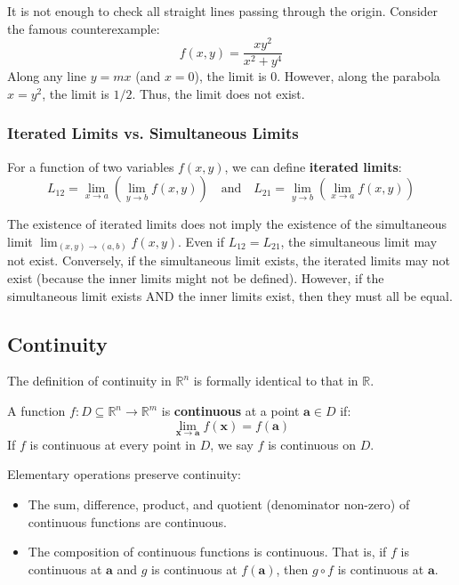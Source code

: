 \documentclass[oneside]{book}
\begin{document}
\begin{remark}
It is not enough to check all straight lines passing through the origin. Consider the famous counterexample:
\[ f(x, y) = \frac{x y^2}{x^2 + y^4} \]
Along any line $y = mx$ (and $x=0$), the limit is $0$. However, along the parabola $x = y^2$, the limit is $1/2$. Thus, the limit does not exist.
\end{remark}

\subsubsection{Iterated Limits vs. Simultaneous Limits}

For a function of two variables $f(x,y)$, we can define \textbf{iterated limits}:
\[ L_{12} = \lim_{x \to a} \left( \lim_{y \to b} f(x, y) \right) \quad \text{and} \quad L_{21} = \lim_{y \to b} \left( \lim_{x \to a} f(x, y) \right) \]

\begin{proposition}
The existence of iterated limits does not imply the existence of the simultaneous limit $\lim_{(x,y) \to (a,b)} f(x,y)$.
Even if $L_{12} = L_{21}$, the simultaneous limit may not exist.
Conversely, if the simultaneous limit exists, the iterated limits may not exist (because the inner limits might not be defined).
However, if the simultaneous limit exists AND the inner limits exist, then they must all be equal.
\end{proposition}

\subsection{Continuity}

The definition of continuity in $\mathbb{R}^n$ is formally identical to that in $\mathbb{R}$.

\begin{definition}[Continuity]
A function $f: D \subseteq \mathbb{R}^n \to \mathbb{R}^m$ is \textbf{continuous} at a point $\mathbf{a} \in D$ if:
\[ \lim_{\mathbf{x} \to \mathbf{a}} f(\mathbf{x}) = f(\mathbf{a}) \]
If $f$ is continuous at every point in $D$, we say $f$ is continuous on $D$.
\end{definition}

Elementary operations preserve continuity:
\begin{itemize}
    \item The sum, difference, product, and quotient (denominator non-zero) of continuous functions are continuous.
    \item The composition of continuous functions is continuous. That is, if $f$ is continuous at $\mathbf{a}$ and $g$ is continuous at $f(\mathbf{a})$, then $g \circ f$ is continuous at $\mathbf{a}$.
\end{itemize}
\end{document}
